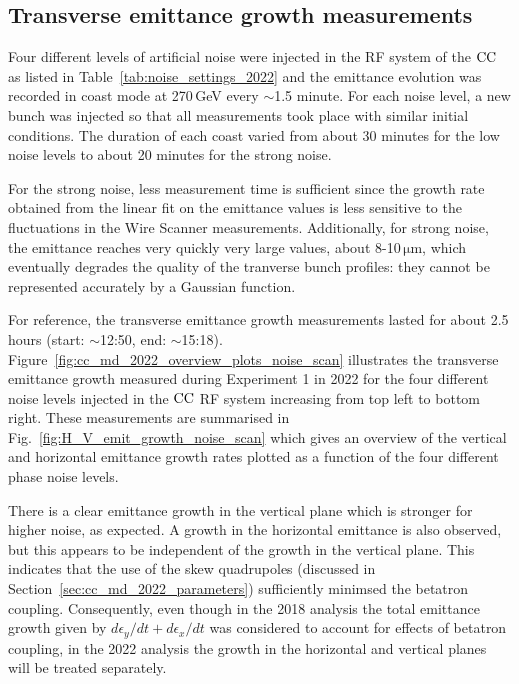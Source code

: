 \subsection{Transverse emittance growth measurements}\label{sec:cc_md_2022_exp1}
Four different levels of artificial noise were injected in the RF system of the ${\mathrm{CC}}$ as listed in Table~\ref{tab:noise_settings_2022} and the emittance evolution was recorded in coast mode at 270\,GeV every $\sim$1.5 minute. For each noise level, a new bunch was injected so that all measurements took place with similar initial conditions. The duration of each coast varied from about 30 minutes for the low noise levels to about 20 minutes for the strong noise. 

For the strong noise, less measurement time is sufficient since the growth rate obtained from the linear fit on the emittance values is less sensitive to the fluctuations in the Wire Scanner measurements. Additionally, for strong noise, the emittance reaches very quickly very large values, about 8-10\,$\mathrm{\mu m}$, which eventually degrades the quality of the tranverse bunch profiles: they cannot be represented accurately by a Gaussian function.  %

For reference, the transverse emittance growth measurements lasted for about 2.5\,hours (start: $\sim$12:50, end: $\sim$15:18). Figure~\ref{fig:cc_md_2022_overview_plots_noise_scan} illustrates the transverse emittance growth measured during Experiment 1 in 2022 for the four different noise levels injected in the ${\mathrm{CC}}$ RF system increasing from top left to bottom right. These measurements are summarised in Fig.~\ref{fig:H_V_emit_growth_noise_scan} which gives an overview of the vertical and horizontal emittance growth rates plotted as a function of the four different phase noise levels. 

There is a clear emittance growth in the vertical plane which is stronger for higher noise, as expected. A growth in the horizontal emittance is also observed, but this appears to be independent of the growth in the vertical plane. This indicates that the use of the skew quadrupoles (discussed in Section~\ref{sec:cc_md_2022_parameters}) sufficiently minimsed the betatron coupling. Consequently, even though in the 2018 analysis the total emittance growth given by $d\epsilon_y/dt +d\epsilon_x/dt $ was considered to account for effects of betatron coupling, in the 2022 analysis the growth in the horizontal and vertical planes will be treated separately.


